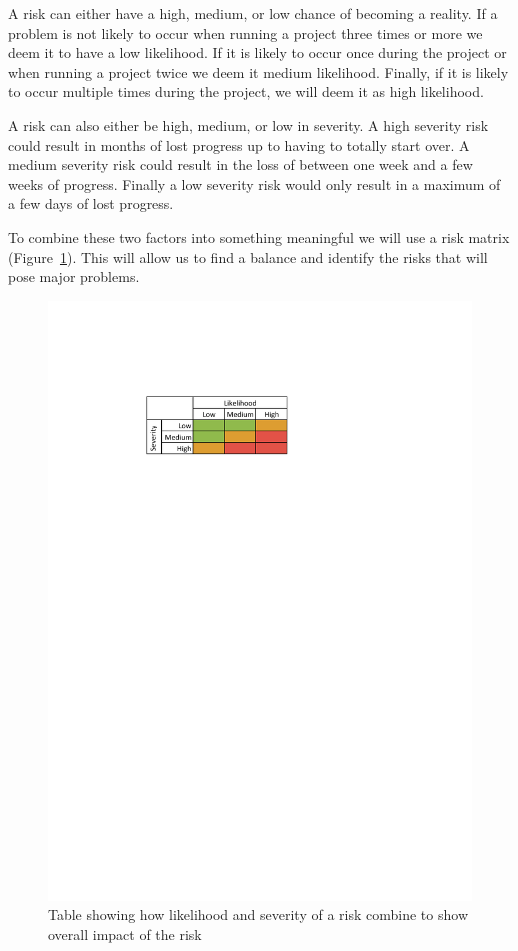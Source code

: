 \documentclass{report}   	%
\begin{document}
A risk can either have a high, medium, or low chance of becoming a reality.
If a problem is not likely to occur when running a project three times or more we deem it to have a low likelihood.
If it is likely to occur once during the project or when running a project twice we deem it medium likelihood.
Finally, if it is likely to occur multiple times during the project, we will deem it as high likelihood.

A risk can also either be high, medium, or low in severity.
A high severity risk could result in months of lost progress up to having to totally start over.
A medium severity risk could result in the loss of between one week and a few weeks of progress.
Finally a low severity risk would only result in a maximum of a few days of lost progress.

To combine these two factors into something meaningful we will use a risk matrix (Figure~\ref{fig:risktable}).
This will allow us to find a balance and identify the risks that will pose major problems.

\begin{figure}[h]
	\begin{centering}
		\includegraphics{risktable.pdf}
		\caption{Table showing how likelihood and severity of a risk combine to show overall impact of the risk}
		\label{fig:risktable}
	\end{centering}
\end{figure}
\end{document}
